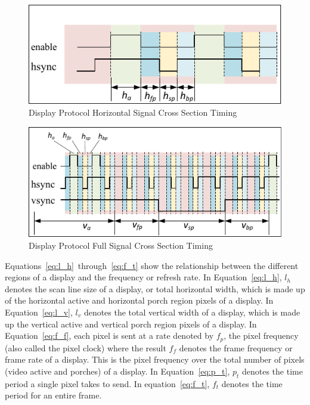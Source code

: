     \begin{figure}[H]
        \centering
        \includegraphics[width=1.0\textwidth]{fig/display_timing_line_cross.pdf}
        \caption{Display Protocol Horizontal Signal Cross Section Timing}
        \label{fig:display_protocol_line_cross}
    \end{figure}

    \begin{figure}[H]
        \centering
        \includegraphics[width=1.0\textwidth]{fig/display_timing_full_cross.pdf}
        \caption{Display Protocol Full Signal Cross Section Timing}
        \label{fig:display_protocol_full_cross}
    \end{figure}

    Equations~\eqref{eq:l_h}~through~\eqref{eq:f_t} show the relationship between the different regions of a display and the frequency or refresh rate. In Equation~\eqref{eq:l_h}, $l_h$ denotes the scan line size of a display, or total horizontal width, which is made up of the horizontal active and horizontal porch region pixels of a display. In Equation~\eqref{eq:l_v}, $l_v$ denotes the total vertical width of a display, which is made up the vertical active and vertical porch region pixels of a display. In Equation~\eqref{eq:f_f}, each pixel is sent at a rate denoted by $f_p$, the pixel frequency (also called the pixel clock) where the result $f_f$ denotes the frame frequency or frame rate of a display. This is the pixel frequency over the total number of pixels (video active and porches) of a display. In Equation~\eqref{eq:p_t}, $p_t$ denotes the time period a single pixel takes to send. In equation~\eqref{eq:f_t}, $f_t$ denotes the time period for an entire frame.


